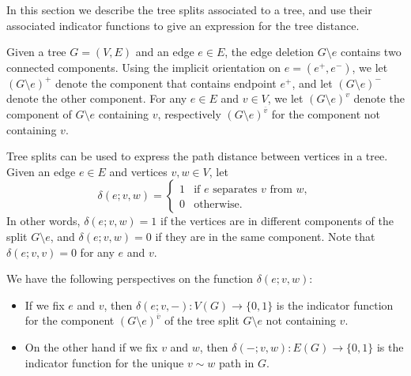 \documentclass{amsart}
\theoremstyle{definition}
\begin{document}
In this section we describe the tree splits associated to a tree, and use their associated indicator functions to give an expression for the tree distance.

Given a tree $G = (V,E)$ and an edge $e \in E$, the edge deletion $G \setminus e$ contains two connected components.
Using the implicit orientation on $e = (e^+,e^-)$,
we let $(G \setminus e)^+$ denote the component that contains endpoint $e^+$, and let $(G\setminus e)^-$ denote the other component.
For any $e \in E$ and $v \in V$,
we let
$(G \setminus e)^{v}$ denote the component of $G\setminus e$ containing $v$,
respectively $(G\setminus e)^{\overline v}$ for the component not containing $v$.


Tree splits can be used to express the path distance between vertices in a tree.
Given an edge $e\in E$ and vertices $v,w \in V$, let 
\begin{equation}
\delta(e;v,w) = \begin{cases}
  1 &\text{if $e$ separates  $v$ from $w$}, \\
  0 &\text{otherwise}.
\end{cases}
\end{equation}
In other words, $\delta(e; v,w) = 1$ if the vertices are in different components of the split $G \setminus e$,
and $\delta(e; v,w) = 0$ if they are in the same component.
Note that $\delta(e; v,v) = 0$ for any $e$ and $v$.

We have the following perspectives on the function $\delta(e; v,w)$:
\begin{itemize}
\item 
If we fix $e$ and $v$,
then $\delta(e;v, -) : V(G) \to \{0,1\}$ 
is the indicator function for the component 
$(G \setminus e)^{\overline v}$ of the tree split $G \setminus e$
not containing $v$.

\item 
On the other hand if we fix $v$ and $w$, then $\delta(-;v,w) : E(G) \to \{0,1\}$
is the indicator function for the unique $v \sim w$ path in $G$.

\end{itemize}
\end{document}
